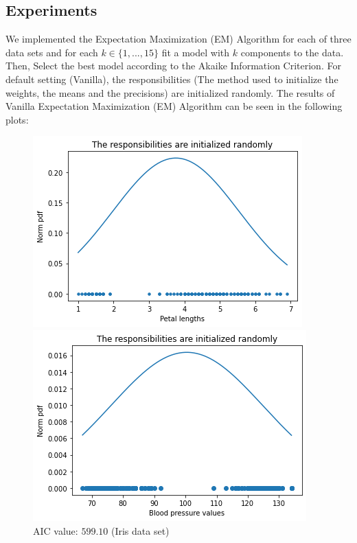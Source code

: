 \documentclass[abstract=true]{scrartcl}
\begin{document}
\subsection{Experiments}
We implemented the Expectation Maximization (EM) Algorithm for each of three data sets and for each $k \in \{1,...,15\}$ fit a model with $k$ components to the data. Then, Select the best model according to the Akaike Information Criterion. For default setting (Vanilla), the responsibilities (The method used to initialize the weights, the means and the precisions) are initialized randomly. The results of Vanilla Expectation Maximization (EM) Algorithm can be seen in the following plots:
\begin{figure}[H]			
	\begin{minipage}[t]{0.5\textwidth}
		\includegraphics[width=\textwidth]{images/random_iris.png}
		\vspace{-20px}
 		\caption{AIC value: $599.10$ (Iris data set)}
	\end{minipage}
	\begin{minipage}[t]{0.5\textwidth}
 		\includegraphics[width=\textwidth]{images/random_bdp.png}

\end{minipage}
\end{figure}
\end{document}
